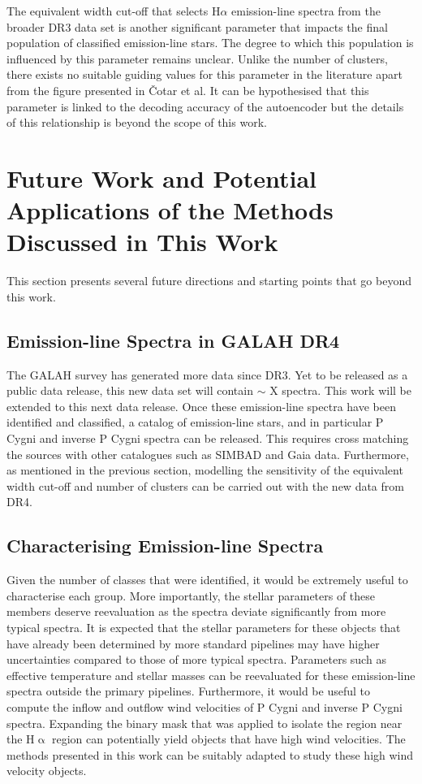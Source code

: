 The equivalent width cut-off that selects H$\alpha$ emission-line spectra from the broader DR3 data set is another significant parameter that impacts the final population of classified emission-line stars. The degree to which this population is influenced by this parameter remains unclear. Unlike the number of clusters, there exists no suitable guiding values for this parameter in the literature apart from the figure presented in Čotar et al. It can be hypothesised that this parameter is linked to the decoding accuracy of the autoencoder but the details of this relationship is beyond the scope of this work.



\section{Future Work and Potential Applications of the Methods Discussed in This Work}

This section presents several future directions and starting points that go beyond this work. 

\subsection{Emission-line Spectra in GALAH DR4}

The GALAH survey has generated more data since DR3. Yet to be released as a public data release, this new data set will contain $\sim$ X spectra. This work will be extended to this next data release. Once these emission-line spectra have been identified and classified, a catalog of emission-line stars, and in particular P Cygni and inverse P Cygni spectra can be released. This requires cross matching the sources with other catalogues such as SIMBAD and Gaia data. Furthermore, as mentioned in the previous section, modelling the sensitivity of the equivalent width cut-off and number of clusters can be carried out with the new data from DR4.

\subsection{Characterising Emission-line Spectra}

Given the number of classes that were identified, it would be extremely useful to characterise each group. More importantly, the stellar parameters of these members deserve reevaluation as the spectra deviate significantly from more typical spectra. It is expected that the stellar parameters for these objects that have already been determined by more standard pipelines may have higher uncertainties compared to those of more typical spectra. Parameters such as effective temperature and stellar masses can be reevaluated for these emission-line spectra outside the primary pipelines. Furthermore, it would be useful to compute the inflow and outflow wind velocities of P Cygni and inverse P Cygni spectra. Expanding the binary mask that was applied to isolate the region near the H$\upalpha$ region can potentially yield objects that have high wind velocities. The methods presented in this work can be suitably adapted to study these high wind velocity objects.

